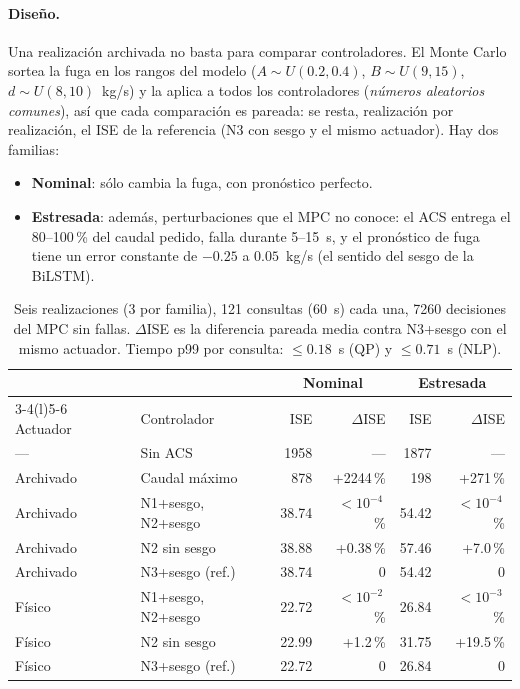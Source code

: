 \paragraph{Diseño.} Una realización archivada no basta para comparar controladores. El
Monte Carlo sortea la fuga en los rangos del modelo ($A\sim U(0.2,0.4)$, $B\sim U(9,15)$,
$d\sim U(8,10)$~kg/s) y la aplica a todos los controladores (\emph{números aleatorios
comunes}), así que cada comparación es pareada: se resta, realización por realización, el
ISE de la referencia (N3 con sesgo y el mismo actuador). Hay dos familias:
\begin{itemize}
  \item \textbf{Nominal}: sólo cambia la fuga, con pronóstico perfecto.
  \item \textbf{Estresada}: además, perturbaciones que el MPC no conoce: el ACS entrega el
        80--100\,\% del caudal pedido, falla durante 5--15~s, y el pronóstico de fuga tiene
        un error constante de $-0.25$ a $0.05$~kg/s (el sentido del sesgo de la BiLSTM).
\end{itemize}

\begin{table}[H]\centering\small
\begin{tabular}{@{}llrrrr@{}}\toprule
& & \multicolumn{2}{c}{Nominal} & \multicolumn{2}{c}{Estresada}\\\cmidrule(lr){3-4}\cmidrule(l){5-6}
Actuador & Controlador & ISE & $\Delta$ISE & ISE & $\Delta$ISE\\\midrule
--- & Sin ACS & 1958 & --- & 1877 & ---\\
Archivado & Caudal máximo & 878 & +2244\,\% & 198 & +271\,\%\\
Archivado & N1+sesgo, N2+sesgo & 38.74 & $<10^{-4}$\,\% & 54.42 & $<10^{-4}$\,\%\\
Archivado & N2 sin sesgo & 38.88 & +0.38\,\% & 57.46 & +7.0\,\%\\
Archivado & N3+sesgo (ref.) & 38.74 & 0 & 54.42 & 0\\
Físico & N1+sesgo, N2+sesgo & 22.72 & $<10^{-2}$\,\% & 26.84 & $<10^{-3}$\,\%\\
Físico & N2 sin sesgo & 22.99 & +1.2\,\% & 31.75 & +19.5\,\%\\
Físico & N3+sesgo (ref.) & 22.72 & 0 & 26.84 & 0\\\bottomrule
\end{tabular}
\caption{Seis realizaciones (3 por familia), 121 consultas (60~s) cada una, 7260 decisiones
del MPC sin fallas. $\Delta$ISE es la diferencia pareada media contra N3+sesgo con el mismo
actuador. Tiempo p99 por consulta: $\le0.18$~s (QP) y $\le0.71$~s (NLP).}
\end{table}

